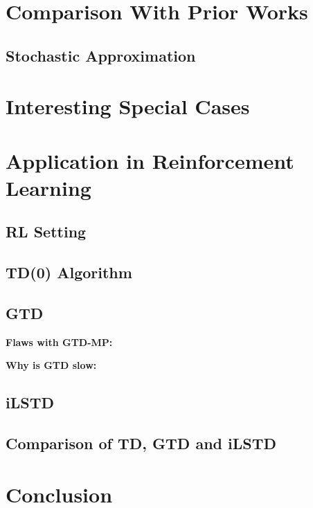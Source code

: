 \documentclass{article}
\begin{document}
\section{Comparison With Prior Works}

\subsection{Stochastic Approximation}

\section{Interesting Special Cases}

\section{Application in Reinforcement Learning}
\subsection{RL Setting}

\subsection{TD(0) Algorithm}


\subsection{GTD}
\textbf{Flaws with GTD-MP:}

\textbf{Why is GTD slow:}


\subsection{iLSTD}

\subsection{Comparison of TD, GTD and iLSTD}

\section{Conclusion}


\appendix


\end{document}
